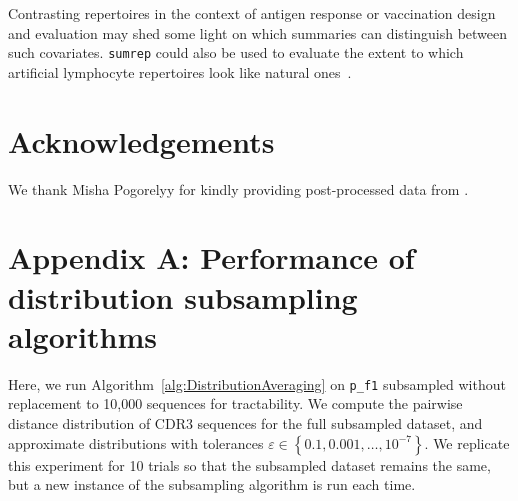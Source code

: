 \documentclass{article}
\newcommand{\beginsupplement}{%
        \setcounter{table}{0}
        \renewcommand{\thetable}{S\arabic{table}}%
        \setcounter{figure}{0}
        \renewcommand{\thefigure}{S\arabic{figure}}%
     }
\begin{document}
Contrasting repertoires in the context of antigen response or vaccination design and evaluation may shed some light on which summaries can distinguish between such covariates.
\texttt{sumrep} could also be used to evaluate the extent to which artificial lymphocyte repertoires look like natural ones~\cite{Finlay2012}.

\section*{Acknowledgements}
We thank Misha Pogorelyy for kindly providing post-processed data from \cite{Pogorelyy2018-ak}.





\beginsupplement

\section*{Appendix A: Performance of distribution subsampling algorithms}
Here, we run Algorithm~\ref{alg:DistributionAveraging} on \texttt{p\_f1} subsampled without replacement to 10,000 sequences for tractability.
We compute the pairwise distance distribution of CDR3 sequences for the full subsampled dataset, and approximate distributions with tolerances $\varepsilon \in \left\{0.1, 0.001, \dotsc, 10^{-7} \right\}$.
We replicate this experiment for 10 trials so that the subsampled dataset remains the same, but a new instance of the subsampling algorithm is run each time.
\end{document}
